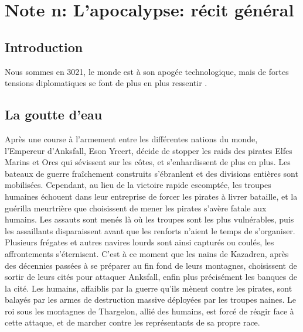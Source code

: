 \section{Note n: L'apocalypse: récit général}
\subsection{Introduction}
Nous sommes en 3021, le monde est à son apogée technologique, mais de fortes tensions diplomatiques se font de plus en plus ressentir .
\subsection{La goutte d'eau}
Après une course à l'armement entre les différentes nations du monde, l'Empereur d'Anksfall, Eson Yrcert, décide de stopper les raids des pirates Elfes Marins et Orcs qui sévissent sur les côtes, et s'enhardissent de plus en plus. Les bateaux de guerre fraîchement construits s'ébranlent et des divisions entières sont mobilisées. Cependant, au lieu de la victoire rapide escomptée, les troupes humaines échouent dans leur entreprise de forcer les pirates à livrer bataille, et la guérilla meurtrière que choisissent de mener les pirates s'avère fatale aux humains. Les assauts sont menés là où les troupes sont les plus vulnérables, puis les assaillants disparaissent avant que les renforts n'aient le temps de s'organiser. Plusieurs frégates et autres navires lourds sont ainsi capturés ou coulés, les affrontements s'éternisent. C'est à ce moment que les nains de Kazadren, après des décennies passées à se préparer au fin fond de leurs montagnes, choisissent de sortir de leurs cités pour attaquer Anksfall, enfin plus précisément les banques de la cité. Les humains, affaiblis par la guerre qu'ils mènent contre les pirates, sont balayés par les armes de destruction massive déployées par les troupes naines. Le roi sous les montagnes de Thargelon, allié des humains, est forcé de réagir face à cette attaque, et de marcher contre les représentants de sa propre race. 
